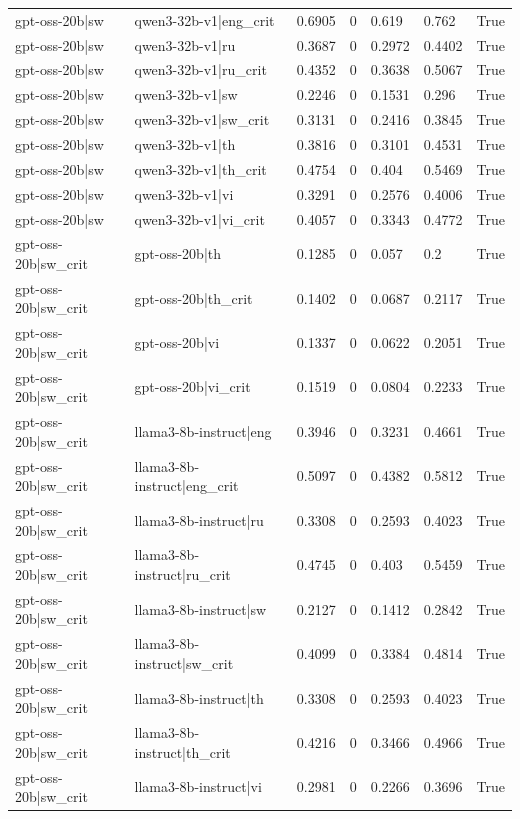 \begin{table}
\begin{tabular}{llllllr}
gpt-oss-20b|sw & qwen3-32b-v1|eng_crit & 0.6905 & 0 & 0.619 & 0.762 & True \\
gpt-oss-20b|sw & qwen3-32b-v1|ru & 0.3687 & 0 & 0.2972 & 0.4402 & True \\
gpt-oss-20b|sw & qwen3-32b-v1|ru_crit & 0.4352 & 0 & 0.3638 & 0.5067 & True \\
gpt-oss-20b|sw & qwen3-32b-v1|sw & 0.2246 & 0 & 0.1531 & 0.296 & True \\
gpt-oss-20b|sw & qwen3-32b-v1|sw_crit & 0.3131 & 0 & 0.2416 & 0.3845 & True \\
gpt-oss-20b|sw & qwen3-32b-v1|th & 0.3816 & 0 & 0.3101 & 0.4531 & True \\
gpt-oss-20b|sw & qwen3-32b-v1|th_crit & 0.4754 & 0 & 0.404 & 0.5469 & True \\
gpt-oss-20b|sw & qwen3-32b-v1|vi & 0.3291 & 0 & 0.2576 & 0.4006 & True \\
gpt-oss-20b|sw & qwen3-32b-v1|vi_crit & 0.4057 & 0 & 0.3343 & 0.4772 & True \\
gpt-oss-20b|sw_crit & gpt-oss-20b|th & 0.1285 & 0 & 0.057 & 0.2 & True \\
gpt-oss-20b|sw_crit & gpt-oss-20b|th_crit & 0.1402 & 0 & 0.0687 & 0.2117 & True \\
gpt-oss-20b|sw_crit & gpt-oss-20b|vi & 0.1337 & 0 & 0.0622 & 0.2051 & True \\
gpt-oss-20b|sw_crit & gpt-oss-20b|vi_crit & 0.1519 & 0 & 0.0804 & 0.2233 & True \\
gpt-oss-20b|sw_crit & llama3-8b-instruct|eng & 0.3946 & 0 & 0.3231 & 0.4661 & True \\
gpt-oss-20b|sw_crit & llama3-8b-instruct|eng_crit & 0.5097 & 0 & 0.4382 & 0.5812 & True \\
gpt-oss-20b|sw_crit & llama3-8b-instruct|ru & 0.3308 & 0 & 0.2593 & 0.4023 & True \\
gpt-oss-20b|sw_crit & llama3-8b-instruct|ru_crit & 0.4745 & 0 & 0.403 & 0.5459 & True \\
gpt-oss-20b|sw_crit & llama3-8b-instruct|sw & 0.2127 & 0 & 0.1412 & 0.2842 & True \\
gpt-oss-20b|sw_crit & llama3-8b-instruct|sw_crit & 0.4099 & 0 & 0.3384 & 0.4814 & True \\
gpt-oss-20b|sw_crit & llama3-8b-instruct|th & 0.3308 & 0 & 0.2593 & 0.4023 & True \\
gpt-oss-20b|sw_crit & llama3-8b-instruct|th_crit & 0.4216 & 0 & 0.3466 & 0.4966 & True \\
gpt-oss-20b|sw_crit & llama3-8b-instruct|vi & 0.2981 & 0 & 0.2266 & 0.3696 & True \\

\end{tabular}
\end{table}
